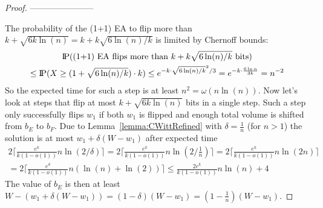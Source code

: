 \begin{proof}

    -----------------------\newline

    The probability of the (1+1) EA to flip more than $k+\sqrt{6k\ln(n)}=k+k\sqrt{6\ln(n)/k}$ is limited by Chernoff bounds:
    \begin{gather}
        \nonumber \text{I\kern-0.15em P}(\text{(1+1) EA flips more than }k+k\sqrt{6\ln(n)/k}\text{ bits})\\ \nonumber
        \le\text{I\kern-0.15em P}(X\ge (1+\sqrt{6\ln(n)/k})\cdot k)
        \le e^{-k\cdot{\sqrt{6\ln(n)/k}}^2/3}
        = e^{-k\cdot \frac{6\ln n}{3k}}
        = n^{-2}
    \end{gather}
    So the expected time for such a step is at least \(n^2=\omega(n\ln(n))\).
    Now let's look at steps that flip at most $k+\sqrt{6k\ln(n)}$ bits in a single step.
    Such a step only successfully flips $w_1$ if both $w_1$ is flipped and enough total volume is shifted from $b_E$ to $b_F$.
    Due to Lemma~\ref{lemma:CWittRefined} with $\delta=\frac{1}{n}$ (for $n>1$) the solution is at most $w_1+\delta(W-w_1)$ after expected time
    \begin{gather}\nonumber
        2\lceil\frac{e^k}{k(1-o(1))}n\ln(2/\delta)\rceil
        =2\lceil\frac{e^k}{k(1-o(1))}n\ln(2/\frac{1}{n})\rceil
        =2\lceil\frac{e^k}{k(1-o(1))}n\ln(2n)\rceil \\ \nonumber
        =2\lceil\frac{e^k}{k(1-o(1))}n(\ln(n)+\ln(2))\rceil
        \le\frac{2e^k}{k(1-o(1))}n\ln(n)+4
    \end{gather}
    The value of $b_E$ is then at least \(W-(w_1+\delta(W-w_1))=(1-\delta)(W-w_1)=(1-\frac{1}{n})(W-w_1)\).


\end{proof}
